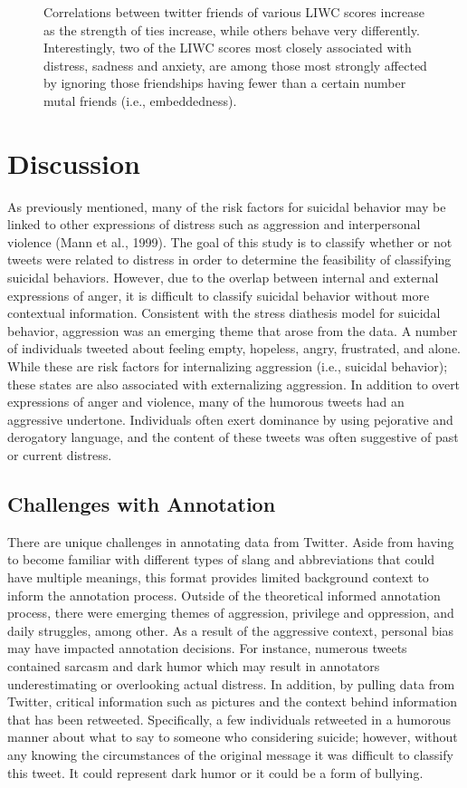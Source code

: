 \documentclass[11pt]{article}
\begin{document}
\begin{figure}
\begin{tabular}{cc}
\end{tabular}
\label{fig:strength}
  \caption{Correlations between twitter friends of various LIWC scores increase as the strength of ties increase, while others behave very differently. Interestingly, two of the LIWC scores most closely associated with distress, sadness and anxiety, are among those most strongly affected by ignoring those friendships having fewer than a certain number mutal friends (i.e., embeddedness).}
\end{figure}


\section{Discussion}

As previously mentioned, many of the risk factors for suicidal behavior may be linked to other expressions of distress such as aggression and interpersonal violence (Mann et al., 1999).  The goal of this study is to classify whether or not tweets were related to distress in order to determine the feasibility of classifying suicidal behaviors.  However, due to the overlap between internal and external expressions of anger, it is difficult to classify suicidal behavior without more contextual information.  Consistent with the stress diathesis model for suicidal behavior, aggression was an emerging theme that arose from the data. A number of individuals tweeted about feeling empty, hopeless, angry, frustrated, and alone.  While these are risk factors for internalizing aggression (i.e., suicidal behavior); these states are also associated with externalizing aggression.  In addition to overt expressions of anger and violence, many of the humorous tweets had an aggressive undertone.  Individuals often exert dominance by using pejorative and derogatory language, and the content of these tweets was often suggestive of past or current distress.  

\subsection{Challenges with Annotation}

There are unique challenges in annotating data from Twitter.  Aside from having to become familiar with different types of slang and abbreviations that could have multiple meanings, this format provides limited background context to inform the annotation process.  Outside of the theoretical informed annotation process, there were emerging themes of aggression, privilege and oppression, and daily struggles, among other.  As a result of the aggressive context, personal bias may have impacted annotation decisions. For instance, numerous tweets contained sarcasm and dark humor which may result in annotators underestimating or overlooking actual distress. In addition, by pulling data from Twitter, critical information such as pictures and the context behind information that has been retweeted.  Specifically, a few individuals retweeted in a humorous manner about what to say to someone who considering suicide; however, without any knowing the circumstances of the original message it was difficult to classify this tweet.  It could represent dark humor or it could be a form of bullying.
\end{document}
